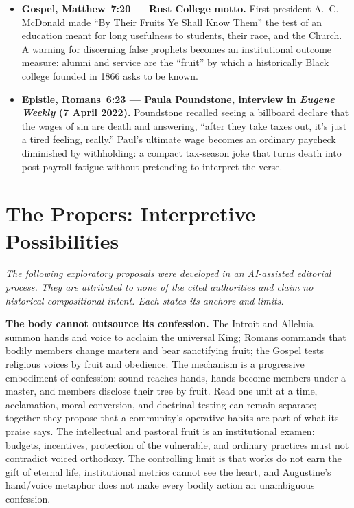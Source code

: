 \begin{deepstudy}
{\begin{itemize}[itemsep=0.35em,topsep=0.2em,parsep=0pt]
\item \textbf{Gospel, Matthew~7:20 --- Rust College motto.} First president A.~C. McDonald made ``By Their Fruits Ye Shall Know Them'' the test of an education meant for long usefulness to students, their race, and the Church. A warning for discerning false prophets becomes an institutional outcome measure: alumni and service are the ``fruit'' by which a historically Black college founded in 1866 asks to be known.

\item \textbf{Epistle, Romans~6:23 --- Paula Poundstone, interview in \emph{Eugene Weekly} (7 April 2022).} Poundstone recalled seeing a billboard declare that the wages of sin are death and answering, ``after they take taxes out, it's just a tired feeling, really.'' Paul's ultimate wage becomes an ordinary paycheck diminished by withholding: a compact tax-season joke that turns death into post-payroll fatigue without pretending to interpret the verse.
\end{itemize}
}

\sectionguard
\section*{The Propers: Interpretive Possibilities}

\noindent\emph{The following exploratory proposals were developed in an AI-assisted editorial process. They are attributed to none of the cited authorities and claim no historical compositional intent. Each states its anchors and limits.}

\noindent\textbf{The body cannot outsource its confession.\enspace{}}
The Introit and Alleluia summon hands and voice to acclaim the universal King; Romans commands that bodily members change masters and bear sanctifying fruit; the Gospel tests religious voices by fruit and obedience. The mechanism is a progressive embodiment of confession: sound reaches hands, hands become members under a master, and members disclose their tree by fruit. Read one unit at a time, acclamation, moral conversion, and doctrinal testing can remain separate; together they propose that a community's operative habits are part of what its praise says. The intellectual and pastoral fruit is an institutional examen: budgets, incentives, protection of the vulnerable, and ordinary practices must not contradict voiced orthodoxy. The controlling limit is that works do not earn the gift of eternal life, institutional metrics cannot see the heart, and Augustine's hand/voice metaphor does not make every bodily action an unambiguous confession.


\end{deepstudy}
